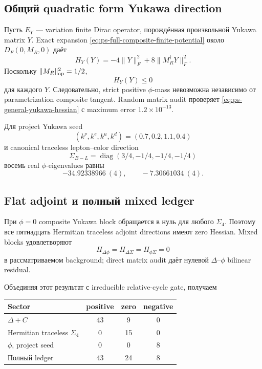 \subsection{Общий quadratic form Yukawa direction}

Пусть \(E_Y\) --- variation finite Dirac operator, порождённая произвольной
Yukawa matrix \(Y\). Exact expansion
\eqref{eq:ps-full-composite-finite-potential} около \(D_F(0,M_R,0)\) даёт
\begin{equation}
 \boxed{
 H_Y(Y)=-4\|Y\|_F^2+8\|M_R^\dagger Y\|_F^2.}
 \label{eq:ps-general-yukawa-hessian}
\end{equation}
Поскольку \(\|M_R\|_{\rm op}^2=1/2\),
\begin{equation}
 H_Y(Y)\le0
\end{equation}
для каждого \(Y\). Следовательно, strict positive \(\phi\)-mass невозможна
независимо от parametrization composite tangent. Random matrix audit
проверяет \eqref{eq:ps-general-yukawa-hessian} с maximum error
\(1.2\times10^{-13}\).

Для project Yukawa seed
\begin{equation}
 (k^\nu,k^e,k^u,k^d)=(0.7,0.2,1.1,0.4)
\end{equation}
и canonical traceless lepton--color direction
\begin{equation}
 \Sigma_{B-L}=\operatorname{diag}(3/4,-1/4,-1/4,-1/4)
\end{equation}
восемь real \(\phi\)-eigenvalues равны
\begin{equation}
 -34.92338966\ (4),
 \qquad
 -7.30661034\ (4).
 \label{eq:ps-phi-negative-spectrum}
\end{equation}

\subsection{Flat adjoint и полный mixed ledger}

При \(\phi=0\) composite Yukawa block обращается в нуль для любого
\(\Sigma_4\). Поэтому все пятнадцать Hermitian traceless adjoint directions
имеют zero Hessian. Mixed blocks удовлетворяют
\begin{equation}
 H_{\Delta\phi}=H_{\Delta\Sigma}=H_{\phi\Sigma}=0
\end{equation}
в рассматриваемом background; direct matrix audit даёт нулевой
\(\Delta\)--\(\phi\) bilinear residual.

Объединяя этот результат с irreducible relative-cycle gate, получаем
\begin{center}
\begin{tabular}{lccc}
\toprule
Sector & positive & zero & negative\\
\midrule
\(\Delta+C\) & 43 & 9 & 0\\
Hermitian traceless \(\Sigma_4\) & 0 & 15 & 0\\
\(\phi\), project seed & 0 & 0 & 8\\
\midrule
Полный ledger & 43 & 24 & 8\\
\bottomrule
\end{tabular}
\end{center}

